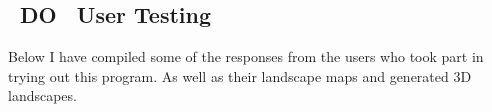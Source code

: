 \documentclass[11pt]{article}
\begin{document}
\subsection{~DO~ User Testing}

Below I have compiled some of the responses from the users who took part in
trying out this program. As well as their landscape maps and generated
3D landscapes.
\end{document}
